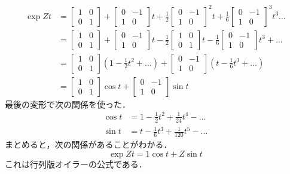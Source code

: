 \documentclass{jsbook}
\begin{document}
\begin{align}
\exp Zt&=\begin{bmatrix}1&0\\0&1\end{bmatrix}+\begin{bmatrix}0&-1\\1&0\end{bmatrix}t+\frac{1}{2}\begin{bmatrix}0&-1\\1&0\end{bmatrix}^2t+\frac{1}{6}\begin{bmatrix}0&-1\\1&0\end{bmatrix}^3t^3\dots\\
&=\begin{bmatrix}1&0\\0&1\end{bmatrix}+\begin{bmatrix}0&-1\\1&0\end{bmatrix}t-\frac{1}{2}\begin{bmatrix}1&0\\0&1\end{bmatrix}t-\frac{1}{6}\begin{bmatrix}0&-1\\1&0\end{bmatrix}t^3+\dots\\
&=\begin{bmatrix}1&0\\0&1\end{bmatrix}\left(1-\frac{1}{2}t^2+\dots\right)+\begin{bmatrix}0&-1\\1&0\end{bmatrix}\left(t-\frac{1}{6}t^3+\dots\right)\\
&=\begin{bmatrix}1&0\\0&1\end{bmatrix}\cos t+\begin{bmatrix}0&-1\\1&0\end{bmatrix}\sin t
\end{align}
最後の変形で次の関係を使った．
\begin{align}
\cos t&=1-\frac{1}{2}t^2+\frac{1}{24}t^4-\dots\\
\sin t&=t-\frac{1}{6}t^3+\frac{1}{120}t^5-\dots
\end{align}
まとめると，次の関係があることがわかる．
\begin{equation}
\exp Zt=1\cos t+Z\sin t
\end{equation}
これは行列版オイラーの公式である．
\end{document}
